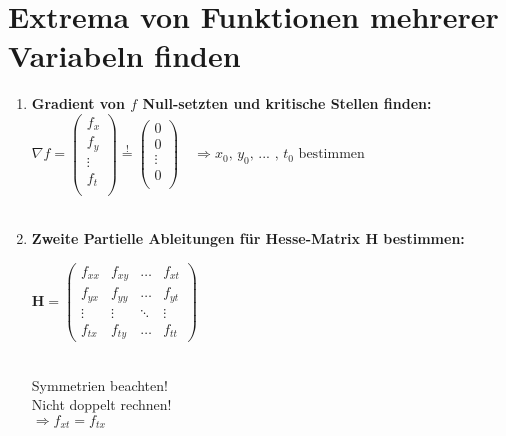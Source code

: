 \newpage
\section{Extrema von Funktionen mehrerer Variabeln finden}

\begin{enumerate}
    \item \textbf{Gradient von $f$ Null-setzten und kritische Stellen finden:}\\
    $\nabla f=
    \begin{pmatrix}
        f_x\\
        f_y\\
        \vdots \\
        f_t\\
    \end{pmatrix} \stackrel{!}{=}
    \begin{pmatrix}
        0\\
        0\\
        \vdots \\
        0\\
    \end{pmatrix}
    \, \, \, \, \, \, \Rightarrow
    x_0 \text{, } y_0 \text{, ... }  \text{, } t_0 \text{ bestimmen}
    $\\\\
    
    \item \textbf{Zweite Partielle Ableitungen für Hesse-Matrix H bestimmen:}\\
    \begin{minipage}[t]{0.48\columnwidth}
        $\mathbf{H}=\begin{pmatrix}
            f_{xx}&f_{xy}&\ldots &f_{xt}\\
            f_{yx}&f_{yy}&\ldots&f_{yt}\\
            \vdots &\vdots &\ddots &\vdots \\
            f_{tx}&f_{ty}&\ldots&f_{tt}
        \end{pmatrix}$\\\\
    \end{minipage}
    \hfill
    \begin{minipage}[c]{0.48\columnwidth}
        Symmetrien beachten!\\
        Nicht doppelt rechnen!\\
        $\Rightarrow f_{xt} = f_{tx}$\\
    \end{minipage}


\end{enumerate}
